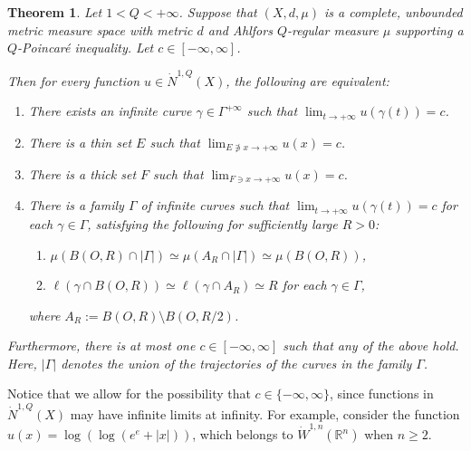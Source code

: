 \documentclass[10pt]{amsart}
\newtheorem{theorem}{Theorem}[section]
\numberwithin{equation}{section}
\newcommand{\R}{\mathbb{R}}
\begin{document}
\begin{theorem}\label{thm1.3-2208}
Let  $1<Q<+\infty$. Suppose that $(X,d,\mu)$ is a complete,  unbounded metric measure space with metric $d$ and Ahlfors $Q$-regular measure $\mu$ supporting a $Q$-Poincar\'e inequality. Let $c\in[-\infty,\infty]$. 

Then for every function $u\in\dot N^{1,Q}(X)$, the following are equivalent:
\begin{enumerate}
 \item[{\rm I.}] There exists an infinite curve $\gamma\in\Gamma^{+\infty}$ such that $\lim_{t\to+\infty}u(\gamma(t))=c$.
 \item[{\rm II.}] There is a thin set $E$ such that $\lim_{E\not\ni x\to+\infty}u(x)=c$.
 \item[{\rm III.}]   There is a thick set $F$ such that $\lim_{F\ni x\to+\infty}u(x)=c$.
 \item[{\rm IV.}] There is a family $\Gamma$ of infinite curves such that $\lim_{t\to+\infty}u(\gamma(t))=c$  for each $\gamma\in\Gamma$, satisfying the following for sufficiently large $R>0$: 
\begin{enumerate}
    \item [{\rm 1.}] $ \mu(B(O,R)\cap|\Gamma|)\simeq \mu(A_R\cap |\Gamma|)\simeq\mu(B(O,R))$,
     \item [{\rm 2.}] $\ell(\gamma\cap B(O,R))\simeq \ell(\gamma\cap A_R)\simeq R$ for each $\gamma\in\Gamma$,
\end{enumerate}
where $A_R:=B(O,R)\setminus B(O,R/2)$. 
\end{enumerate}
 Furthermore, there is at most one $c\in[-\infty,\infty]$ such that any of the above hold.  Here, $|\Gamma|$ denotes the union of the trajectories of the curves in the family $\Gamma$.
\end{theorem}
  Notice that we allow for the possibility that $c\in\{-\infty,\infty\}$, since functions in $\dot N^{1,Q}(X)$ may have infinite limits at infinity.  For example, consider the function $u(x)=\log(\log(e^e+|x|))$, which belongs to $\dot W^{1,n}(\R^n)$ when $n\ge 2$.    

\end{document}
